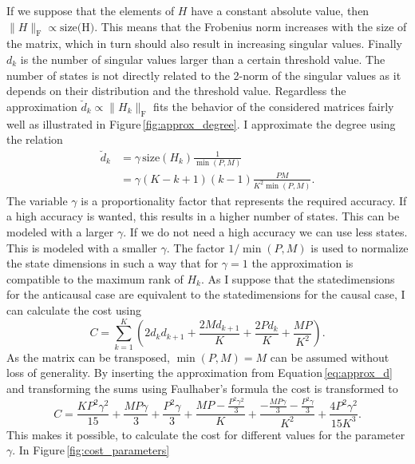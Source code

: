 \documentclass[numbers=noenddot,doctype=mastersthesis,BCOR=15mm,biblatex]{ldvbook}%
\begin{document}
If we suppose that the elements of $H$ have a constant absolute value, then $\|H\|_\text{F} \propto \text{size(H)}$.
This means that the Frobenius norm increases with the size of the matrix, which in turn should also result in increasing singular values.
Finally $d_k$ is the number of singular values larger than a certain threshold value.
The number of states is not directly related to the 2-norm of the singular values as it depends on their distribution and the threshold value.%
Regardless the approximation $\breve{d}_k \propto \|H_k\|_\text{F}$ fits the behavior of the considered matrices fairly well as illustrated in Figure\,\ref{fig:approx_degree}.
I approximate the degree using the relation
\begin{align}\label{eq:approx_d}
	\breve{d}_k 
	&= \gamma \,\text{size}(H_k) \frac{1}{\min(P,M)}\\
	&= \gamma (K-k+1)(k-1)\frac{PM}{K^2\min(P,M)}.
\end{align}
The variable $\gamma$ is a proportionality factor that represents the required accuracy. 
If a high accuracy is wanted, this results in a higher number of states. 
This can be modeled with a larger $\gamma$.
If we do not need a high accuracy we can use less states.
This is modeled with a smaller $\gamma$.
The factor $1/\min(P,M)$ is used to normalize the state dimensions in such a way that for $\gamma = 1$ the approximation is compatible to the maximum rank of $H_k$. 
As I suppose that the statedimensions for the anticausal case are equivalent to the statedimensions for the causal case, I can calculate the cost using
\begin{equation}
C = \sum_{k=1}^{K} \left(2 d_{k} d_{k+1} + \frac{2 M d_{k+1}}{K} + \frac{2 P d_{k}}{K} + \frac{M P}{K^{2}}\right)
.
\end{equation}
As the matrix can be transposed, $\min(P,M)=M$ can be assumed without loss of generality.
By inserting the approximation from Equation\,\ref{eq:approx_d} and transforming the sums using Faulhaber's formula \cite{knuth_johann_1993} the cost is transformed to
\begin{equation}\label{eq:cost_of_K}
C = \frac{K P^{2} \gamma^{2}}{15} + \frac{M P \gamma}{3} + \frac{P^{2} \gamma}{3} + \frac{M P - \frac{P^{2} \gamma^{2}}{3}}{K} + \frac{- \frac{M P \gamma}{3} - \frac{P^{2} \gamma}{3}}{K^{2}} + \frac{4 P^{2} \gamma^{2}}{15 K^{3}}
.
\end{equation}
This makes it possible, to calculate the cost for different values for the parameter $\gamma$.
In Figure\,\ref{fig:cost_parameters} 
\end{document}
